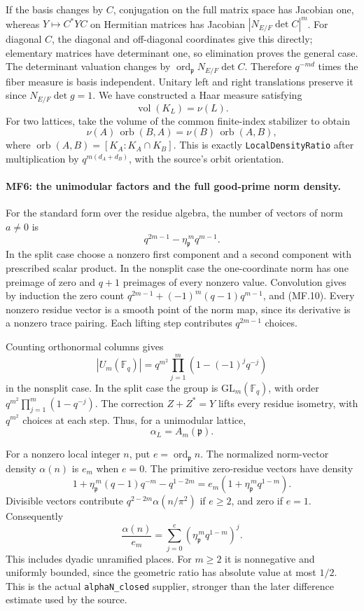 If the basis changes by \(C\), conjugation on the full matrix space
has Jacobian one, whereas \(Y\mapsto C^*YC\) on Hermitian matrices
has Jacobian \(|N_{E/F}\det C|^m\).
For diagonal \(C\), the diagonal and off-diagonal coordinates give
this directly; elementary matrices have determinant one, so
elimination proves the general case.
The determinant valuation changes by
\(\operatorname{ord}_{\mathfrak p}N_{E/F}\det C\).
Therefore \(q^{-md}\) times the fiber measure is basis independent.
Unitary left and right translations preserve it since
\(N_{E/F}\det g=1\). We have constructed a Haar measure satisfying
\[
                \operatorname{vol}(K_L)=\nu(L).       \tag{MF.8}
\]
For two lattices, take the volume of the common finite-index
stabilizer to obtain
\[
 \nu(A)\,\operatorname{orb}(B,A)
          =\nu(B)\,\operatorname{orb}(A,B),             \tag{MF.9}
\]
where \(\operatorname{orb}(A,B)=[K_A:K_A\cap K_B]\).
This is exactly \texttt{LocalDensityRatio} after multiplication by
\(q^{m(d_A+d_B)}\), with the source's orbit orientation.

\paragraph{MF6: the unimodular factors and the full good-prime norm density.}
For the standard form over the residue algebra, the number of vectors
of norm \(a\ne0\) is
\[
                 q^{2m-1}-\eta_{\mathfrak p}^{\,m}q^{m-1}.
                                                               \tag{MF.10}
\]
In the split case choose a nonzero first component and a second
component with prescribed scalar product.
In the nonsplit case the one-coordinate norm has one preimage of
zero and \(q+1\) preimages of every nonzero value.
Convolution gives by induction the zero count
\(q^{2m-1}+(-1)^m(q-1)q^{m-1}\), and (MF.10).
Every nonzero residue vector is a smooth point of the norm map,
since its derivative is a nonzero trace pairing. Each lifting
step contributes \(q^{2m-1}\) choices.

Counting orthonormal columns gives
\[
 |U_m(\mathbb F_q)|=q^{m^2}\prod_{j=1}^m(1-(-1)^jq^{-j})
\]
in the nonsplit case. In the split case the group is
\(\mathrm{GL}_m(\mathbb F_q)\), with order
\(q^{m^2}\prod_{j=1}^m(1-q^{-j})\).
The correction \(Z+Z^*=Y\) lifts every residue isometry, with
\(q^{m^2}\) choices at each step. Thus, for a unimodular lattice,
\[
                         \alpha_L=A_m(\mathfrak p).   \tag{MF.11}
\]

For a nonzero local integer \(n\), put
\(e=\operatorname{ord}_{\mathfrak p}n\).
The normalized norm-vector density \(\alpha(n)\) is \(e_m\) when
\(e=0\). The primitive zero-residue vectors have density
\[
 1+\eta_{\mathfrak p}^{\,m}(q-1)q^{-m}-q^{1-2m}
        =e_m(1+\eta_{\mathfrak p}^{\,m}q^{1-m}).
\]
Divisible vectors contribute \(q^{2-2m}\alpha(n/\pi^2)\) if \(e\ge2\),
and zero if \(e=1\). Consequently
\[
 \frac{\alpha(n)}{e_m}
       =\sum_{j=0}^{e}
              (\eta_{\mathfrak p}^{\,m}q^{1-m})^j.     \tag{MF.12}
\]
This includes dyadic unramified places. For \(m\ge2\) it is
nonnegative and uniformly bounded, since the geometric ratio has
absolute value at most \(1/2\).
This is the actual \texttt{alphaN\_closed} supplier, stronger than
the later difference estimate used by the source.

